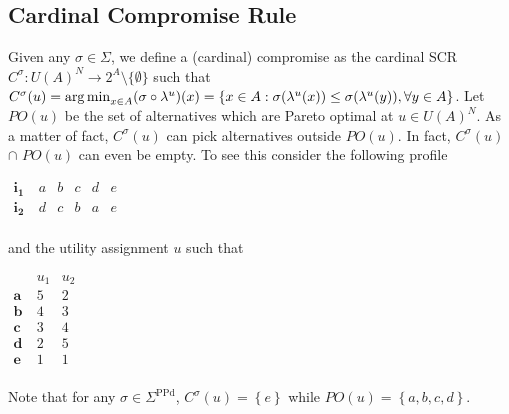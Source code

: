 \documentclass[version=3.21, pagesize, notitlepage, twoside=off, bibliography=totoc, DIV=calc, fontsize=12pt, a4paper]{scrartcl}
\newcommand{\paretopt}{\mathit{PO}}
\newcommand{\SPPd}{\Sigma^\text{PPd}}
\begin{document}
\subsection{Cardinal Compromise Rule}
Given any $\sigma \in \Sigma$, we define a (cardinal) compromise as the cardinal SCR $C^{\sigma }:U(A)^{N}\rightarrow 2^{A} \setminus \{\emptyset \}$ such that $C^{\sigma }(u) = \operatorname*{arg\,min}_{x \in A} (\sigma \circ \lambda^u)(x) = \left\{ x\in A:\sigma (\lambda ^{u}(x))\leq \sigma (\lambda ^{u}(y)), \forall y\in A\right\} $. Let $\paretopt(u)$ be the set of alternatives which are Pareto optimal at $u\in U(A)^{N}$. As a matter of fact, $C^{\sigma }(u)$ can pick alternatives outside $\paretopt(u)$. In fact, $C^{\sigma }(u)$ $\cap $ $\paretopt(u)$ can even be empty. To see this consider the following profile
\begin{center}
	$
	\begin{array}{cccccc}
	\mathbf{i_1} \ & a & b & c & d & e \\
	\mathbf{i_2} \ & d & c & b & a & e \\
	\end{array}
	$
\end{center}
and the utility assignment $u$ such that
\begin{center}
	$
	\begin{array}{ccc}
	& u_1 & u_2 \\
	\mathbf{a} \ & 5 & 2 \\
	\mathbf{b} \ & 4 & 3 \\
	\mathbf{c} \ & 3 & 4 \\
	\mathbf{d} \ & 2 & 5 \\
	\mathbf{e} \ & 1 & 1 \\
	\end{array}
	$
\end{center}
Note that for any $\sigma \in \SPPd $, $C^{\sigma }(u)=\left\{ e\right\} $ while $\paretopt(u)=\left\{ a, b, c, d\right\} $. 
\end{document}
